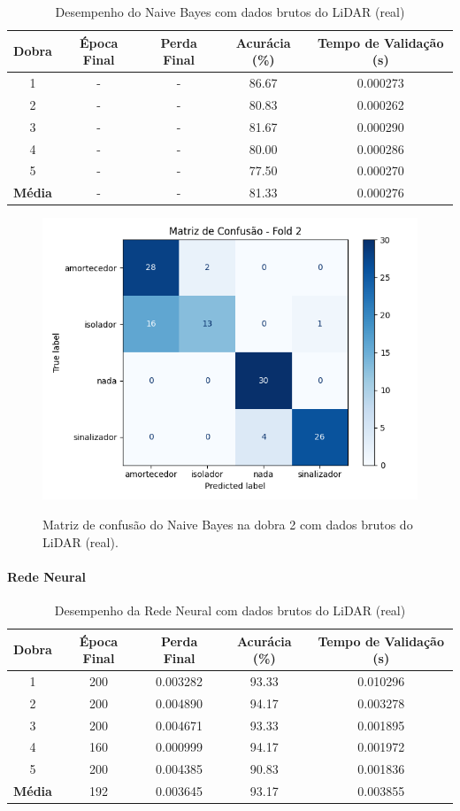 \begin{table}[H]
\centering
\caption{Desempenho do Naive Bayes com dados brutos do LiDAR (real)}
\label{tab:naive_lidar_bruto_real}
\begin{tabular}{ccccc}
\hline
\textbf{Dobra} & \textbf{Época Final} & \textbf{Perda Final} & \textbf{Acurácia (\%)} & \textbf{Tempo de Validação (s)} \\
\hline
1 & - & - & 86.67 & 0.000273 \\
2 & - & - & 80.83 & 0.000262 \\
3 & - & - & 81.67 & 0.000290 \\
4 & - & - & 80.00 & 0.000286 \\
5 & - & - & 77.50 & 0.000270 \\
\hline
\textbf{Média} & - & - & 81.33 & 0.000276 \\
\hline
\end{tabular}
\fonte{}
\end{table}

\begin{figure}[H]
\caption{Matriz de confusão do Naive Bayes na dobra 2 com dados brutos do LiDAR (real).}
\includegraphics[width=0.7\linewidth]{figuras/Resultados/real_principal_Teste2_naive.png}
\fonte{}
\label{fig:matriz_confusao_naive_lidar_real_dobra2}
\end{figure}

\paragraph{Rede Neural}

\begin{table}[H]
\centering
\caption{Desempenho da Rede Neural com dados brutos do LiDAR (real)}
\label{tab:nn_lidar_bruto_real}
\begin{tabular}{ccccc}
\hline
\textbf{Dobra} & \textbf{Época Final} & \textbf{Perda Final} & \textbf{Acurácia (\%)} & \textbf{Tempo de Validação (s)} \\
\hline
1 & 200 & 0.003282 & 93.33 & 0.010296 \\
2 & 200 & 0.004890 & 94.17 & 0.003278 \\
3 & 200 & 0.004671 & 93.33 & 0.001895 \\
4 & 160 & 0.000999 & 94.17 & 0.001972 \\
5 & 200 & 0.004385 & 90.83 & 0.001836 \\
\hline
\textbf{Média} & 192 & 0.003645 & 93.17 & 0.003855 \\
\hline
\end{tabular}
\fonte{}
\end{table}

